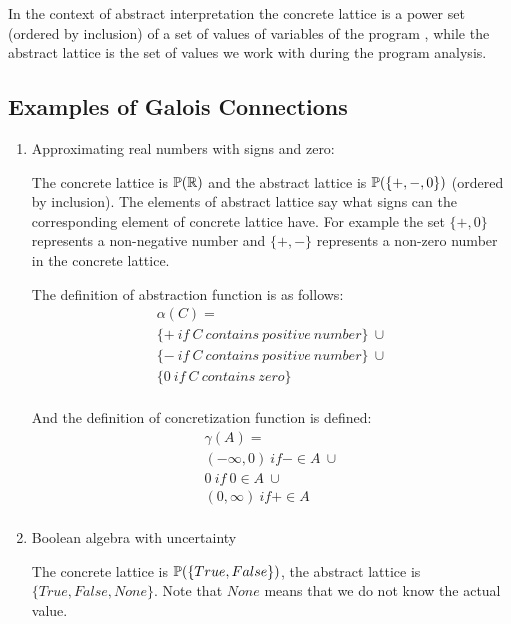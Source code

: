 In the context of abstract interpretation the concrete lattice is a power set (ordered by inclusion) of a set of values
of variables of the program , while the abstract lattice is the set of values we work with during the program analysis.

\subsection*{Examples of Galois Connections}
\begin{enumerate}
    \item Approximating real numbers with signs and zero:

    The concrete lattice is $\mathbb{P}(\mathbb{R})$ and the abstract lattice is $\mathbb{P}(\{+, -, 0\})$ (ordered by %
    inclusion).
    The elements of abstract lattice say what signs can the corresponding element of concrete lattice have.
    For example the set $\{+, 0\}$ represents a non-negative number and $\{+, -\}$ represents a non-zero number in the
    concrete lattice.

    The definition of abstraction function is as follows:
    \begin{gather*}
        \alpha(C) =\\
        \{+ \: if \: C \: contains \: positive \: number\} \: \cup\\
        \{- \: if \: C \: contains \: positive \: number\} \: \cup\\
        \{0 \: if \: C \: contains \: zero\}\\
    \end{gather*}

    And the definition of concretization function is defined:
    \begin{gather*}
        \gamma(A) =\\
        (-\infty, 0) \: if - \in A \: \cup\\
        {0} \: if \: 0 \in A \: \cup\\
        (0, \infty) \: if + \in A \: \\
    \end{gather*}

    \item Boolean algebra with uncertainty

    The concrete lattice is $\mathbb{P}(\{True, False\})$, the abstract lattice is $\{True, False, None\}$.
    Note that $None$ means that we do not know the actual value.


\end{enumerate}

